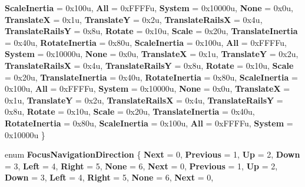 \begin{DoxyCompactItemize}
{\bfseries Scale\+Inertia} = 0x100u, 
{\bfseries All} = 0x\+F\+F\+F\+Fu, 
{\bfseries System} = 0x10000u, 
\newline
{\bfseries None} = 0x0u, 
{\bfseries TranslateX} = 0x1u, 
{\bfseries TranslateY} = 0x2u, 
{\bfseries Translate\+RailsX} = 0x4u, 
\newline
{\bfseries Translate\+RailsY} = 0x8u, 
{\bfseries Rotate} = 0x10u, 
{\bfseries Scale} = 0x20u, 
{\bfseries Translate\+Inertia} = 0x40u, 
\newline
{\bfseries Rotate\+Inertia} = 0x80u, 
{\bfseries Scale\+Inertia} = 0x100u, 
{\bfseries All} = 0x\+F\+F\+F\+Fu, 
{\bfseries System} = 0x10000u, 
\newline
{\bfseries None} = 0x0u, 
{\bfseries TranslateX} = 0x1u, 
{\bfseries TranslateY} = 0x2u, 
{\bfseries Translate\+RailsX} = 0x4u, 
\newline
{\bfseries Translate\+RailsY} = 0x8u, 
{\bfseries Rotate} = 0x10u, 
{\bfseries Scale} = 0x20u, 
{\bfseries Translate\+Inertia} = 0x40u, 
\newline
{\bfseries Rotate\+Inertia} = 0x80u, 
{\bfseries Scale\+Inertia} = 0x100u, 
{\bfseries All} = 0x\+F\+F\+F\+Fu, 
{\bfseries System} = 0x10000u, 
\newline
{\bfseries None} = 0x0u, 
{\bfseries TranslateX} = 0x1u, 
{\bfseries TranslateY} = 0x2u, 
{\bfseries Translate\+RailsX} = 0x4u, 
\newline
{\bfseries Translate\+RailsY} = 0x8u, 
{\bfseries Rotate} = 0x10u, 
{\bfseries Scale} = 0x20u, 
{\bfseries Translate\+Inertia} = 0x40u, 
\newline
{\bfseries Rotate\+Inertia} = 0x80u, 
{\bfseries Scale\+Inertia} = 0x100u, 
{\bfseries All} = 0x\+F\+F\+F\+Fu, 
{\bfseries System} = 0x10000u
 \}
\item 
\mbox{\label{namespace_windows_1_1_u_i_1_1_xaml_1_1_input_a79a24b7b4f6dcfda601ea71a4020fd05}} 
enum {\bfseries Focus\+Navigation\+Direction} \{ \newline
{\bfseries Next} = 0, 
{\bfseries Previous} = 1, 
{\bfseries Up} = 2, 
{\bfseries Down} = 3, 
\newline
{\bfseries Left} = 4, 
{\bfseries Right} = 5, 
{\bfseries None} = 6, 
{\bfseries Next} = 0, 
\newline
{\bfseries Previous} = 1, 
{\bfseries Up} = 2, 
{\bfseries Down} = 3, 
{\bfseries Left} = 4, 
\newline
{\bfseries Right} = 5, 
{\bfseries None} = 6, 
{\bfseries Next} = 0, 

\end{DoxyCompactItemize}
